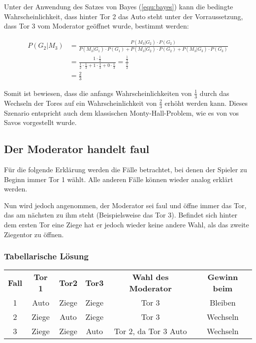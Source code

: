 Unter der Anwendung des Satzes von Bayes (\autoref{equ:bayes}) kann die bedingte Wahrscheinlichkeit, dass hinter Tor 2 das Auto steht unter der Vorraussetzung, dass Tor 3 vom Moderator geöffnet wurde, bestimmt werden:

\begin{equation}
    \begin{split}
        P(G_2 | M_3) & = \frac{P(M_3 | G_2) \cdot P(G_2)}{P(M_3 | G_1) \cdot P(G_1) +
            P(M_3 | G_2) \cdot P(G_2) + P(M_3 | G_3) \cdot P(G_3)} \\
        & = \frac{1 \cdot \frac{1}{3}}{\frac{1}{2} \cdot \frac{1}{3} + 1 \cdot \frac{1}{3} + 0 \cdot \frac{1}{3}} = \frac{\frac{1}{3}}{\frac{1}{2}} \\
        & = \frac{2}{3}
    \end{split}
\end{equation}

Somit ist bewiesen, dass die anfangs Wahrscheinlichkeiten von $\frac{1}{3}$ durch das Wechseln der Tores auf ein Wahrscheinlichkeit von $\frac{2}{3}$ erhöht werden kann. Dieses Szenario entspricht auch dem klassischen Monty-Hall-Problem, wie es von vos Savos vorgestellt wurde.


\subsection{Der Moderator handelt faul}

Für die folgende Erklärung werden die Fälle betrachtet, bei denen der Spieler zu Beginn immer Tor 1 wählt. Alle anderen Fälle können wieder analog erklärt werden.

Nun wird jedoch angenommen, der Moderator sei faul und öffne immer das Tor, das am nächsten zu ihm steht (Beispielsweise das Tor 3). Befindet sich hinter dem ersten Tor eine Ziege hat er jedoch wieder keine andere Wahl, als das zweite Ziegentor zu öffnen.

\subsubsection{Tabellarische Lösung}

\begin{tabular}[h]{cccccc}
    \textbf{Fall} & \textbf{Tor 1} & \textbf{Tor2} & \textbf{Tor3} & \textbf{Wahl des Moderator} & \textbf{Gewinn beim} \\
    1             & Auto           & Ziege         & Ziege         & Tor 3                       & Bleiben              \\
    2             & Ziege          & Auto          & Ziege         & Tor 3                       & Wechseln             \\
    3             & Ziege          & Ziege         & Auto          & Tor 2, da Tor 3 Auto        & Wechseln             \\
\end{tabular}

